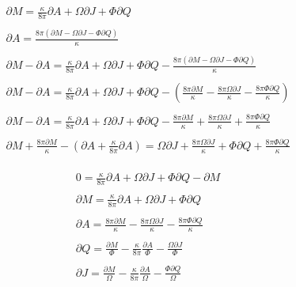 \begin{equation*}
\displaystyle \begin{array}{lll}\\
 \displaystyle  \partial M = \frac{\kappa}{8 \pi} \partial A + \Omega \partial J + \Phi \partial Q \\\\
 \displaystyle  \partial A = \frac{8 \pi(\partial M - \Omega \partial J - \Phi \partial Q)}{\kappa}\\\\
 \displaystyle  \partial M - \partial A = \frac{\kappa}{8 \pi} \partial A + \Omega \partial J + \Phi \partial Q - \frac{8 \pi(\partial M - \Omega \partial J - \Phi \partial Q)}{\kappa}\\\\
 \displaystyle  \partial M - \partial A = \frac{\kappa}{8 \pi} \partial A + \Omega \partial J + \Phi \partial Q - (\frac{8 \pi \partial M}{\kappa} - \frac{8 \pi \Omega \partial J}{\kappa} - \frac{8 \pi \Phi \partial Q}{\kappa})\\\\
 \displaystyle  \partial M - \partial A = \frac{\kappa}{8 \pi} \partial A + \Omega \partial J + \Phi \partial Q - \frac{8 \pi \partial M}{\kappa} + \frac{8 \pi \Omega \partial J}{\kappa} + \frac{8 \pi \Phi \partial Q}{\kappa}\\\\
 \displaystyle  \partial M + \frac{8 \pi \partial M}{\kappa} - (\partial A + \frac{\kappa}{8 \pi} \partial A) = \Omega \partial J + \frac{8 \pi \Omega \partial J}{\kappa} + \Phi \partial Q + \frac{8 \pi \Phi \partial Q}{\kappa}\\\\
\end{array}
\end{equation*}
\begin{equation*}
\displaystyle \begin{array}{lll}\\
 \displaystyle  0 = \frac{\kappa}{8 \pi} \partial A + \Omega \partial J + \Phi \partial Q - \partial M \\\\
 \displaystyle  \partial M = \frac{\kappa}{8 \pi} \partial A + \Omega \partial J + \Phi \partial Q \\\\
 \displaystyle  \partial A = \frac{8 \pi\partial M}{\kappa} - \frac{8 \pi \Omega \partial J}{\kappa} - \frac{8 \pi \Phi \partial Q}{\kappa}\\\\
 \displaystyle  \partial Q = \frac{\partial M}{\Phi} - \frac{\kappa}{8 \pi} \frac{ \partial A}{\Phi} - \frac{\Omega \partial J}{\Phi} \\\\
 \displaystyle  \partial J = \frac{\partial M}{\Omega} - \frac{\kappa}{8 \pi} \frac{ \partial A}{\Omega} - \frac{\Phi \partial Q}{\Omega} \\\\
\end{array}
\end{equation*}
